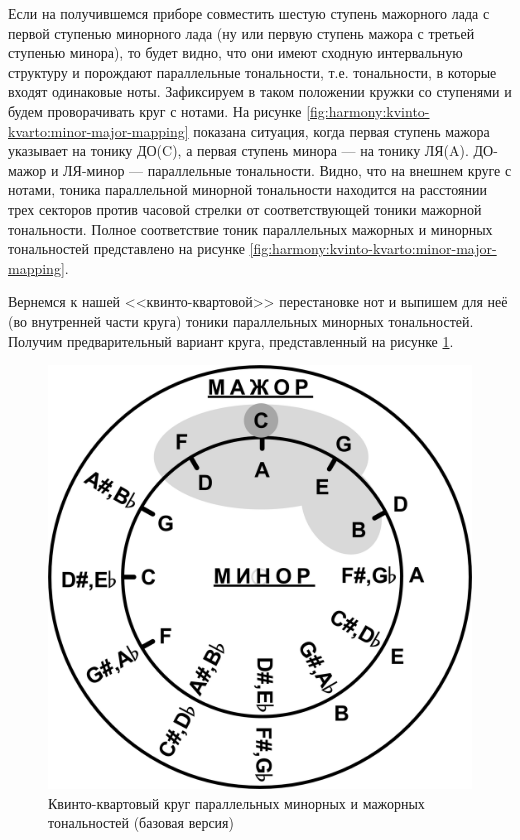 Если на получившемся приборе совместить шестую ступень мажорного лада с первой ступенью минорного лада (ну или первую ступень мажора с третьей ступенью минора), то будет видно, что они имеют сходную интервальную структуру и порождают параллельные тональности, т.е. тональности, в которые входят одинаковые ноты. Зафиксируем в таком положении кружки со ступенями и будем проворачивать круг с нотами. На рисунке \ref{fig:harmony:kvinto-kvarto:minor-major-mapping} показана ситуация, когда первая ступень мажора указывает на тонику ДО(C), а первая ступень минора --- на тонику ЛЯ(A). ДО-мажор и ЛЯ-минор --- параллельные тональности. Видно, что на внешнем круге с нотами, тоника параллельной минорной тональности находится на расстоянии трех секторов против часовой стрелки от соответствующей тоники мажорной тональности. Полное соответствие тоник параллельных мажорных и минорных тональностей представлено на рисунке \ref{fig:harmony:kvinto-kvarto:minor-major-mapping}.

Вернемся к нашей <<квинто-квартовой>> перестановке нот и выпишем для неё (во внутренней части круга) тоники параллельных минорных тональностей. Получим предварительный вариант круга, представленный на рисунке \ref{fig:harmony:kvinto-kvarto:kvinto-kvarto-parallel}.

\begin{figure}[!ht]
    \centering
    \includegraphics[scale=0.5]{fig/kvinto-kvarto/kvinto-kvarto-parallel} 
    \caption{Квинто-квартовый круг параллельных минорных и мажорных тональностей (базовая версия)}\label{fig:harmony:kvinto-kvarto:kvinto-kvarto-parallel}
\end{figure}

